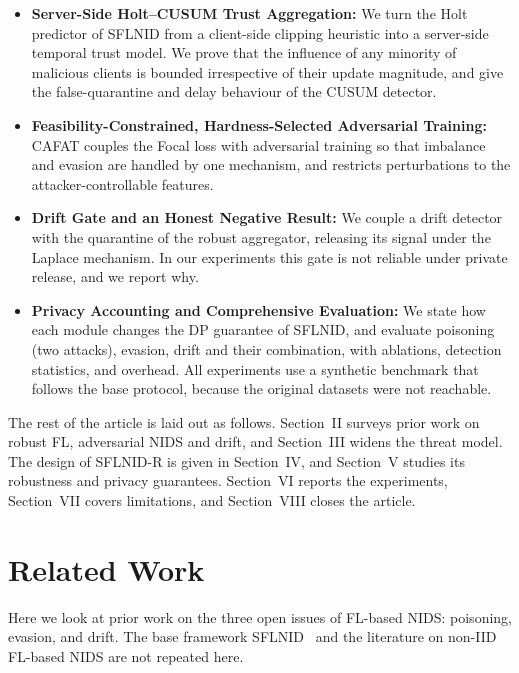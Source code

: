 \documentclass[journal]{IEEEtran}
\begin{document}
\begin{itemize}
\item \textbf{Server-Side Holt--CUSUM Trust Aggregation:} We turn the Holt predictor of SFLNID from a client-side clipping heuristic into a server-side temporal trust model. We prove that the influence of any minority of malicious clients is bounded irrespective of their update magnitude, and give the false-quarantine and delay behaviour of the CUSUM detector.
\item \textbf{Feasibility-Constrained, Hardness-Selected Adversarial Training:} CAFAT couples the Focal loss with adversarial training so that imbalance and evasion are handled by one mechanism, and restricts perturbations to the attacker-controllable features.
\item \textbf{Drift Gate and an Honest Negative Result:} We couple a drift detector with the quarantine of the robust aggregator, releasing its signal under the Laplace mechanism. In our experiments this gate is not reliable under private release, and we report why.
\item \textbf{Privacy Accounting and Comprehensive Evaluation:} We state how each module changes the DP guarantee of SFLNID, and evaluate poisoning (two attacks), evasion, drift and their combination, with ablations, detection statistics, and overhead. All experiments use a synthetic benchmark that follows the base protocol, because the original datasets were not reachable.
\end{itemize}

The rest of the article is laid out as follows. Section~II surveys prior work on robust FL, adversarial NIDS and drift, and Section~III widens the threat model. The design of SFLNID-R is given in Section~IV, and Section~V studies its robustness and privacy guarantees. Section~VI reports the experiments, Section~VII covers limitations, and Section~VIII closes the article.

\section{Related Work}
Here we look at prior work on the three open issues of FL-based NIDS: poisoning, evasion, and drift. The base framework SFLNID~\cite{sflnid} and the literature on non-IID FL-based NIDS are not repeated here.
\end{document}
